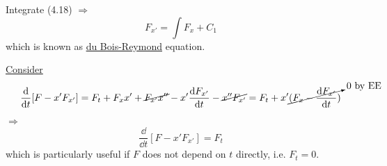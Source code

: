 \documentclass[twoside]{article}
\newcommand\imp{$\Longrightarrow$}
\begin{document}
Integrate (4.18) \imp
\begin{equation}
    F_{x'} = \int F_x + C_1
\end{equation}
which is known as \underline{du Bois-Reymond} equation.

\underline{Consider}
\begin{equation}
    \frac{\mathrm{d} }{\mathrm{d} t}[F - x' F_{x'}] = F_{t} + F_{x}x' + \cancel{F_{x'} x''} - x' \frac{\mathrm{d} F_{x'} }{\mathrm{d} t} - \cancel{x'' F_{x'}} = F_t + x' \cancelto{0 \text{ by EE}}{(F_x - \frac{\mathrm{d} F_{x'} }{\mathrm{d} t})}
\end{equation}
\imp
\begin{equation}
    \frac{\dd }{\dd t}[F - x' F_{x'}] = F_t
\end{equation}
which is particularly useful if $F$ does not depend on $t$ directly, i.e. $F_t = 0$.
\end{document}
